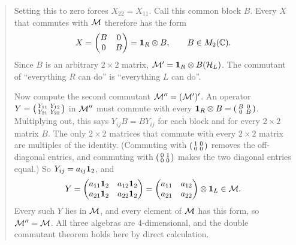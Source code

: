 \begin{quote}
Setting this to zero forces $X_{22}=X_{11}$. Call this common block $B$. Every $X$ that commutes with $\mathcal{M}$
therefore has the form
\[
X = \begin{pmatrix} B & 0 \\ 0 & B \end{pmatrix} = \mathbf{1}_R \otimes B , \qquad B \in M_2(\mathbb C) .
\]
Since $B$ is an arbitrary $2\times2$ matrix, $\mathcal{M}' = \mathbf{1}_R \otimes B(\mathcal{H}_L)$. The commutant of ``everything
$R$ can do'' is ``everything $L$ can do''.

Now compute the second commutant $\mathcal{M}''=(\mathcal{M}')'$. An operator
$Y=\begin{psmallmatrix} Y_{11} & Y_{12} \\ Y_{21} & Y_{22} \end{psmallmatrix}$ in $\mathcal{M}''$ must commute with
every $\mathbf{1}_R\otimes B=\begin{psmallmatrix} B & 0 \\ 0 & B \end{psmallmatrix}$. Multiplying out, this says
$Y_{ij}B=BY_{ij}$ for each block and for every $2\times2$ matrix $B$. The only $2\times2$ matrices that commute
with every $2\times2$ matrix are multiples of the identity. (Commuting with
$\begin{psmallmatrix}1&0\\0&0\end{psmallmatrix}$ removes the off-diagonal entries, and commuting with
$\begin{psmallmatrix}0&1\\0&0\end{psmallmatrix}$ makes the two diagonal entries equal.) So
$Y_{ij}=a_{ij}\mathbf{1}_2$, and
\[
Y = \begin{pmatrix} a_{11}\mathbf{1}_2 & a_{12}\mathbf{1}_2 \\ a_{21}\mathbf{1}_2 & a_{22}\mathbf{1}_2 \end{pmatrix}
= \begin{pmatrix} a_{11} & a_{12} \\ a_{21} & a_{22} \end{pmatrix} \otimes \mathbf{1}_L \in \mathcal{M} .
\]
Every such $Y$ lies in $\mathcal{M}$, and every element of $\mathcal{M}$ has this form, so $\mathcal{M}''=\mathcal{M}$. All three algebras are
4-dimensional, and the double commutant theorem holds here by direct calculation.


\end{quote}
